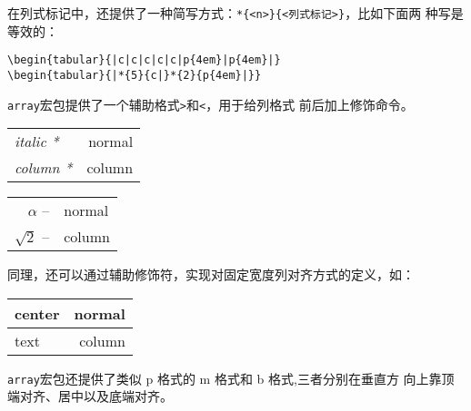 \documentclass{article}
\begin{document}
在列式标记中，还提供了一种简写方式：\verb!*{<n>}{<列式标记>}!，比如下面两
种写是等效的：

\begin{verbatim}
\begin{tabular}{|c|c|c|c|c|p{4em}|p{4em}|}
\begin{tabular}{|*{5}{c|}*{2}{p{4em}|}}
\end{verbatim}

\texttt{array}宏包提供了一个辅助格式\texttt{>}和\texttt{<}，用于给列格式
前后加上修饰命令。
   
\begin{table}[htpb]
  \centering
  \begin{tabular}{ >{\itshape}l<{*}   r}
    \hline
    italic & normal \\
    column & column \\
    \hline
  \end{tabular}
\end{table}

\begin{table}[H]
  \centering
  \begin{tabular}{>{$}r<{$ --} @{\ }l}
    \alpha & normal \\
    \sqrt{2} & column \\
  \end{tabular}
\end{table}

同理，还可以通过辅助修饰符，实现对固定宽度列对齐方式的定义，如：

\begin{table}[H]
  \centering
  \begin{tabular}{ | >{\centering\arraybackslash}p{8em} | r |}
    \hline
    center & normal \\
    \hline
    text & column \\
    \hline
  \end{tabular}
\end{table}

\texttt{array}宏包还提供了类似 p 格式的 m 格式和 b 格式,三者分别在垂直方
向上靠顶端对齐、居中以及底端对齐。
\end{document}
